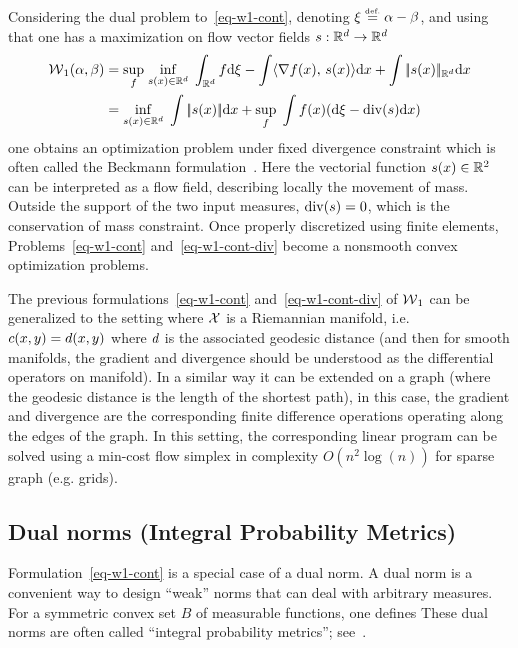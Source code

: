 Considering the dual problem to~\eqref{eq-w1-cont}, denoting $\xi \stackrel{\mbox{\upshape\tiny def.}}{=} \alpha-\beta$, and using that
one has a maximization on flow vector fields $s :  \mathbb{R}^d \rightarrow \mathbb{R}^d$ 
\begin{align*}
	\operatorname{\mathcal{W}}_1(\alpha,\beta) &= 
	\underset{f}{\sup}\; \underset{s(x) \in \mathbb{R}^d}{\inf}\; \int_{\mathbb{R}^d} f \mathrm{d}\xi - \int \langle \nabla f(x),\,s(x)\rangle \mathrm{d} x + \int |\!| s(x) |\!|_{\mathbb{R}^d} \mathrm{d} x \\
	&= 
	\underset{s(x) \in \mathbb{R}^d}{\inf}\; \int |\!| s(x) |\!| \mathrm{d} x
		+ \underset{f}{\sup}\; \int f(x) ( \mathrm{d} \xi - \operatorname{div}(s) \mathrm{d} x) 
\end{align*}
one obtains an optimization problem under fixed divergence constraint
which is often called the Beckmann formulation~\cite{Beckmann52}.
%
Here the vectorial function $s(x) \in \mathbb{R}^2$ can be interpreted as a flow field, describing locally the movement of mass. Outside the support of the two input measures, $\operatorname{div}(s)=0$, which is the conservation of mass constraint. 
%
Once properly discretized using finite elements, Problems~\eqref{eq-w1-cont} and~\eqref{eq-w1-cont-div} become a nonsmooth convex optimization problems. 

The previous formulations~\eqref{eq-w1-cont} and~\eqref{eq-w1-cont-div} of $\operatorname{\mathcal{W}}_1$ can be generalized to the setting where $\mathcal{X}$ is a Riemannian  manifold, i.e. $c(x,y)=d(x,y)$ where $d$ is the associated geodesic distance (and then for smooth manifolds, the gradient and divergence should be understood as the differential operators on manifold). In a similar way it can be extended on a graph (where the geodesic distance is the length of the shortest path), in this case, the gradient and divergence are the corresponding finite difference operations operating along the edges of the graph. In this setting, the corresponding linear program can be solved using a min-cost flow simplex in complexity $O(n^2 \log(n))$ for sparse graph (e.g. grids). 


\subsection{Dual norms (Integral Probability Metrics)}
\label{sec-dual-norms}

Formulation~\eqref{eq-w1-cont} is a special case of a dual norm. A dual norm is a convenient way to design ``weak'' norms that can deal with arbitrary measures. For a symmetric convex set $B$ of measurable functions, one defines 
These dual norms are often called ``integral probability metrics''; see~\cite{sriperumbudur2012empirical}.


